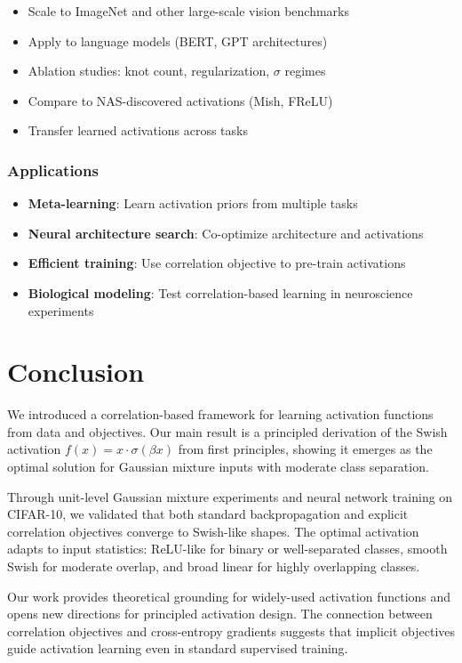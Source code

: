 \documentclass{article}
\begin{document}
\begin{itemize}
\item Scale to ImageNet and other large-scale vision benchmarks
\item Apply to language models (BERT, GPT architectures)
\item Ablation studies: knot count, regularization, $\sigma$ regimes
\item Compare to NAS-discovered activations (Mish, FReLU)
\item Transfer learned activations across tasks
\end{itemize}

\subsubsection{Applications}

\begin{itemize}
\item \textbf{Meta-learning}: Learn activation priors from multiple tasks
\item \textbf{Neural architecture search}: Co-optimize architecture and activations
\item \textbf{Efficient training}: Use correlation objective to pre-train activations
\item \textbf{Biological modeling}: Test correlation-based learning in neuroscience experiments
\end{itemize}

\section{Conclusion}
\label{sec:conclusion}

We introduced a correlation-based framework for learning activation functions from data and objectives. Our main result is a principled derivation of the Swish activation $f(x) = x \cdot \sigma(\beta x)$ from first principles, showing it emerges as the optimal solution for Gaussian mixture inputs with moderate class separation.

Through unit-level Gaussian mixture experiments and neural network training on CIFAR-10, we validated that both standard backpropagation and explicit correlation objectives converge to Swish-like shapes. The optimal activation adapts to input statistics: ReLU-like for binary or well-separated classes, smooth Swish for moderate overlap, and broad linear for highly overlapping classes.

Our work provides theoretical grounding for widely-used activation functions and opens new directions for principled activation design. The connection between correlation objectives and cross-entropy gradients suggests that implicit objectives guide activation learning even in standard supervised training.
\end{document}
